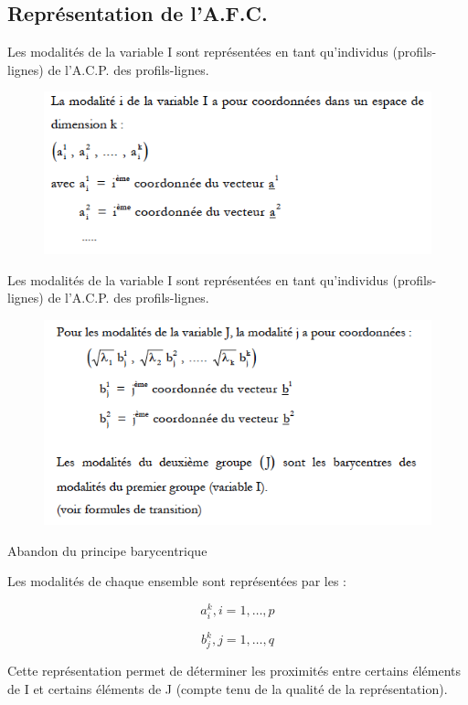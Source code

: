 \documentclass[11pt]{beamer}
\begin{document}
\subsection{Représentation de l'A.F.C.}

\begin{frame}{Les modalités de la variable I sont représentées en tant qu’individus (profils-lignes) de l’A.C.P. des profils-lignes.}

\begin{figure}
\includegraphics[scale=0.6]{exemple14.png}  
\end{figure}

\end{frame}

\begin{frame}{Les modalités de la variable I sont représentées en tant qu’individus (profils-lignes) de l’A.C.P. des profils-lignes.}

\begin{figure}
\includegraphics[scale=0.6]{exemple15.png}  
\end{figure}

\end{frame}

\begin{frame}{Abandon du principe barycentrique}

Les modalités de chaque ensemble sont représentées par les :

$$a^k_i,  i=1, \ldots, p$$

$$b^k_j ,  j=1, \ldots, q $$

Cette représentation permet de déterminer les proximités entre
certains éléments de I et certains éléments de J (compte tenu de la
qualité de la représentation).

\end{frame}
\end{document}
